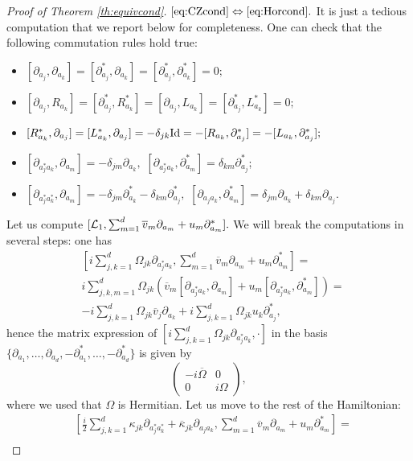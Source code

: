 \documentclass[preprint]{elsarticle}
\theoremstyle{definition}
\begin{document}
\begin{proof}[Proof of Theorem \ref{th:equivcond}]
\bigskip 
$\eqref{eq:CZcond} \Leftrightarrow \eqref{eq:Horcond}.$ It is just a tedious computation that we report below for completeness.  One can check that the following commutation rules hold true:
    \begin{itemize}
    \item $[\partial_{a_j}, \partial_{a_k}]=[\partial^*_{a_j}, \partial_{a_k}]=[\partial^*_{a_j}, \partial^*_{a_k}]=0;$
    \item $[\partial_{a_j}, R_{a_k}]=[\partial^*_{a_j}, R^*_{a_k}]=[\partial_{a_j}, L_{a_k}]=[\partial^*_{a_j}, L^*_{a_k}]=0;$
    \item $[R^*_{a_k},\partial_{a_j}]=[L^*_{a_k},\partial_{a_j} ]=-\delta_{jk}{\rm Id}=-[R_{a_k},\partial^*_{a_j}]=-[L_{a_k},\partial^*_{a_j}];$
    \item $[\partial_{a_j^*a_k}, \partial_{a_m}]=-\delta_{jm}\partial_{a_k},$ $[\partial_{a_j^*a_k}, \partial^*_{a_m}]=\delta_{km}\partial_{a_j}^*$;
    \item $[\partial_{a_j^*a^*_k}, \partial_{a_m}]=-\delta_{jm}\partial^*_{a_k}-\delta_{km}\partial_{a_j}^*,$ $[\partial_{a_ja_k}, \partial^*_{a_m}]=\delta_{jm}\partial_{a_k}+\delta_{km}\partial_{a_j}.$
    \end{itemize}
    Let us compute $[{\cal L}_1,\sum_{m=1}^{d}\overline{v}_m\partial_{a_m}+u_m\partial_{a_m}^*].$ We will break the computations in several steps: one has
    \[\begin{split}
        &\left [i\sum_{j,k=1}^{d}\Omega_{jk} \partial_{a_j^*a_k},\sum_{m=1}^{d}\overline{v}_m\partial_{a_m}+u_m\partial_{a_m}^*\right ]=\\
        &i\sum_{j,k,m=1}^{d}\Omega_{jk}(\overline{v}_m[\partial_{a_j^*a_k},\partial_{a_m}]+u_m[\partial_{a_j^*a_k},\partial^*_{a_m}])=\\
        &-i\sum_{j,k=1}^{d}\Omega_{jk}\overline{v}_j\partial_{a_k}+i\sum_{j,k=1}^{d}\Omega_{jk}u_k\partial^*_{a_j},
    \end{split}\]
    hence the matrix expression of $ \left [i\sum_{j,k=1}^{d}\Omega_{jk} \partial_{a_j^*a_k},\cdot \right ]$ in the basis $\{ \partial_{a_1}, \dots, \partial_{a_d}, -\partial^*_{a_1}, \dots, -\partial_{a_d}^*\}$ is given by
    $$\begin{pmatrix} -i\overline{\Omega} & 0\\
    0 & i\Omega
        \end{pmatrix},$$
        where we used that $\Omega$ is Hermitian. Let us move to the rest of the Hamiltonian:
     \[\begin{split}
        &\left [\frac{i}{2}\sum_{j,k=1}^{d}\kappa_{jk} \partial_{a_j^*a^*_k}+\overline{\kappa}_{jk} \partial_{a_ja_k},\sum_{m=1}^{d}\overline{v}_m\partial_{a_m}+u_m\partial_{a_m}^*\right ]=\\

\end{split}\]
\end{proof}
\end{document}
